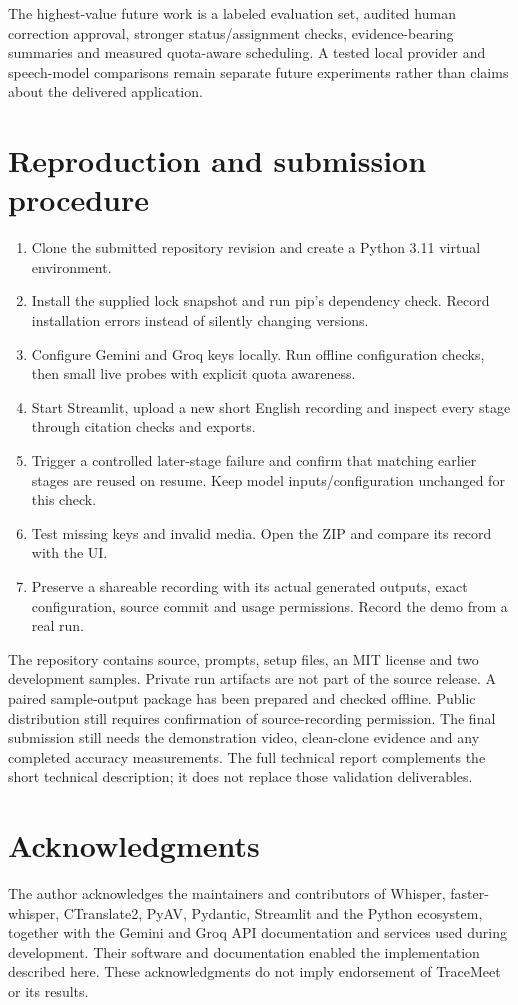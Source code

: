 \documentclass[11pt,a4paper]{article}
\begin{document}
The highest-value future work is a labeled evaluation set, audited human correction approval, stronger status/assignment checks, evidence-bearing summaries and measured quota-aware scheduling. A tested local provider and speech-model comparisons remain separate future experiments rather than claims about the delivered application.

\section{Reproduction and submission procedure}
\begin{enumerate}
\item Clone the submitted repository revision and create a Python 3.11 virtual environment.
\item Install the supplied lock snapshot and run pip's dependency check. Record installation errors instead of silently changing versions.
\item Configure Gemini and Groq keys locally. Run offline configuration checks, then small live probes with explicit quota awareness.
\item Start Streamlit, upload a new short English recording and inspect every stage through citation checks and exports.
\item Trigger a controlled later-stage failure and confirm that matching earlier stages are reused on resume. Keep model inputs/configuration unchanged for this check.
\item Test missing keys and invalid media. Open the ZIP and compare its record with the UI.
\item Preserve a shareable recording with its actual generated outputs, exact configuration, source commit and usage permissions. Record the demo from a real run.
\end{enumerate}

The repository contains source, prompts, setup files, an MIT license and two development samples. Private run artifacts are not part of the source release. A paired sample-output package has been prepared and checked offline. Public distribution still requires confirmation of source-recording permission. The final submission still needs the demonstration video, clean-clone evidence and any completed accuracy measurements. The full technical report complements the short technical description; it does not replace those validation deliverables.

\section*{Acknowledgments}
The author acknowledges the maintainers and contributors of Whisper, faster-whisper, CTranslate2, PyAV, Pydantic, Streamlit and the Python ecosystem, together with the Gemini and Groq API documentation and services used during development. Their software and documentation enabled the implementation described here. These acknowledgments do not imply endorsement of TraceMeet or its results.
\end{document}
